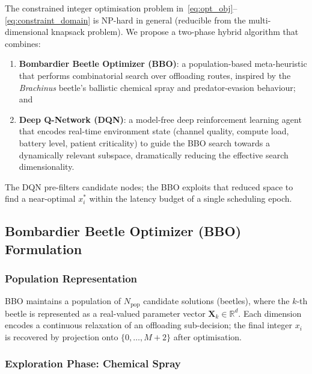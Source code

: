 \documentclass[journal,twoside,letterpaper]{IEEEtran}
\newcommand{\vect}[1]{\mathbf{#1}}
\begin{document}
The constrained integer optimisation problem in~\eqref{eq:opt_obj}--\eqref{eq:constraint_domain}
is NP-hard in general (reducible from the multi-dimensional knapsack problem).
We propose a two-phase hybrid algorithm that combines:
\begin{enumerate}
  \item \textbf{Bombardier Beetle Optimizer (BBO)}: a population-based
        meta-heuristic that performs combinatorial search over offloading
        routes, inspired by the \emph{Brachinus} beetle's ballistic chemical
        spray and predator-evasion behaviour; and
  \item \textbf{Deep Q-Network (DQN)}: a model-free deep reinforcement
        learning agent that encodes real-time environment state (channel
        quality, compute load, battery level, patient criticality) to guide
        the BBO search towards a dynamically relevant subspace, dramatically
        reducing the effective search dimensionality.
\end{enumerate}
The DQN pre-filters candidate nodes; the BBO exploits that reduced space
to find a near-optimal $x_i^*$ within the latency budget of a single
scheduling epoch.

\subsection{Bombardier Beetle Optimizer (BBO) Formulation}
\label{subsec:bbo}

\subsubsection{Population Representation}

BBO maintains a population of $N_{\mathrm{pop}}$ candidate solutions (beetles),
where the $k$-th beetle is represented as a real-valued parameter vector
$\vect{X}_k \in \mathbb{R}^d$.  Each dimension encodes a continuous
relaxation of an offloading sub-decision; the final integer $x_i$ is
recovered by projection onto $\{0, \ldots, M+2\}$ after optimisation.

\subsubsection{Exploration Phase: Chemical Spray}
\end{document}
